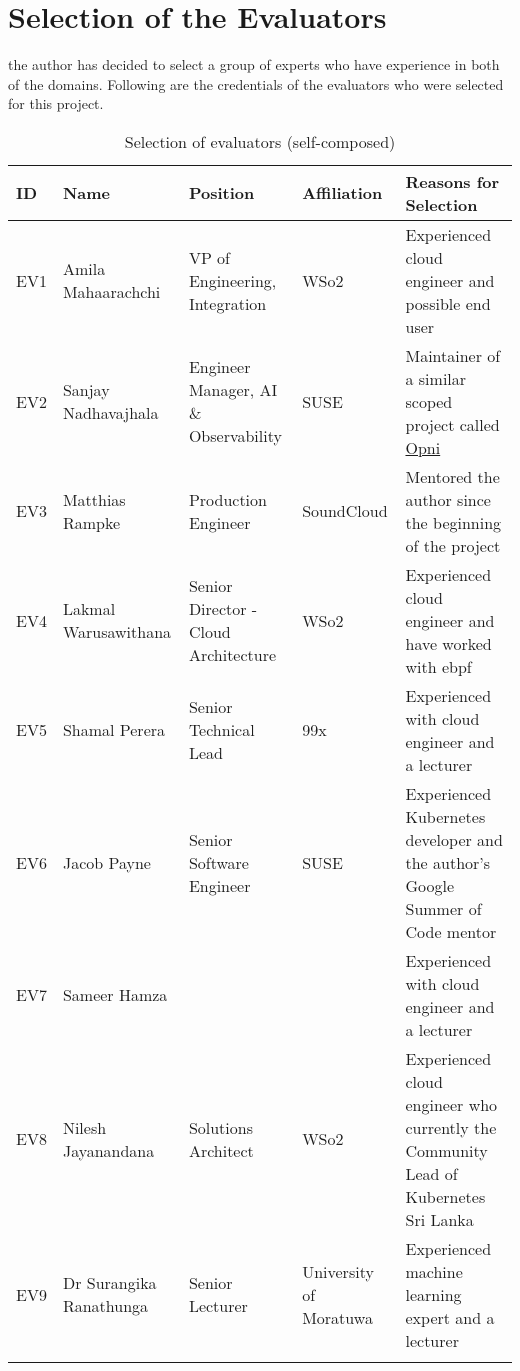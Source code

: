 \section{Selection of the Evaluators}

the author has decided to select a group of experts who have experience in both of the domains. Following are the credentials of the evaluators who were selected for this project. 



\begin{longtable}{|p{8mm}|p{28mm}|p{35mm}|p{21mm}|p{50mm}|}
  \hline
  \textbf{ID} & \textbf{Name} & \textbf{Position} & \textbf{Affiliation} & \textbf{Reasons for Selection} \\ \hline
  EV1 & Amila Mahaarachchi & VP of Engineering, Integration & WSo2 & Experienced cloud engineer  and possible end user \\ \hline
  EV2 & Sanjay Nadhavajhala & Engineer Manager, AI \& Observability & SUSE & Maintainer of a similar scoped project called \href{https://opni.io/}{Opni} \\ \hline
  EV3 & Matthias Rampke & Production Engineer & SoundCloud & Mentored the author since the beginning of the project \\ \hline
  EV4 & Lakmal Warusawithana & Senior Director - Cloud Architecture & WSo2 & Experienced cloud engineer and have worked with \ac{ebpf} \\ \hline
  EV5 & Shamal Perera & Senior Technical Lead & 99x & Experienced with cloud engineer and a lecturer \\ \hline
  EV6 & Jacob Payne & Senior Software Engineer & SUSE & Experienced Kubernetes developer and the author’s Google Summer of Code mentor \\ \hline
  EV7 & Sameer Hamza &  &  & Experienced with cloud engineer and a lecturer \\ \hline
  EV8 & Nilesh Jayanandana & Solutions Architect & WSo2 & Experienced cloud engineer who currently the Community Lead of Kubernetes Sri Lanka \\ \hline
  EV9 & Dr Surangika Ranathunga & Senior Lecturer & University of Moratuwa & Experienced machine learning expert and a lecturer \\ \hline

  \caption{Selection of evaluators (self-composed)}
\end{longtable}

